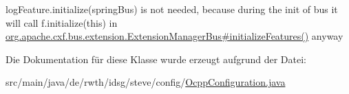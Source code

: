 log\-Feature.\-initialize(spring\-Bus) is not needed, because during the init of bus it will call f.\-initialize(this) in \hyperlink{}{org.\-apache.\-cxf.\-bus.\-extension.\-Extension\-Manager\-Bus\#initialize\-Features()} anyway 

Die Dokumentation für diese Klasse wurde erzeugt aufgrund der Datei\-:\begin{DoxyCompactItemize}
\item 
src/main/java/de/rwth/idsg/steve/config/\hyperlink{_ocpp_configuration_8java}{Ocpp\-Configuration.\-java}\end{DoxyCompactItemize}
